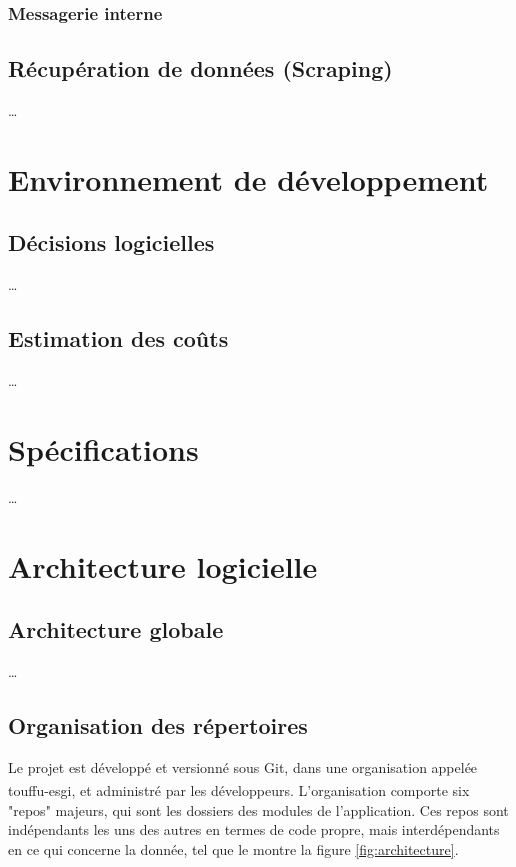 \documentclass[conference]{IEEEtran}
\newcommand{\bibRef}[1]
{\textsuperscript{\cite{#1}}}
\begin{document}
\subsubsection{Messagerie interne}

\subsection{Récupération de données (Scraping)}
…

\section{Environnement de développement}

\subsection{Décisions logicielles}
…

\subsection{Estimation des coûts}
…

\section{Spécifications}
…

\section{Architecture logicielle}

\subsection{Architecture globale}

…

\subsection{Organisation des répertoires}

Le projet est développé et versionné sous Git, dans une organisation appelée touffu-esgi\bibRef{touffu-esgi}, et administré par les développeurs. L'organisation comporte six "repos" majeurs, qui sont les dossiers des modules de l'application. Ces repos sont indépendants les uns des autres en termes de code propre, mais interdépendants en ce qui concerne la donnée, tel que le montre la figure \ref{fig:architecture}.\\
\end{document}
